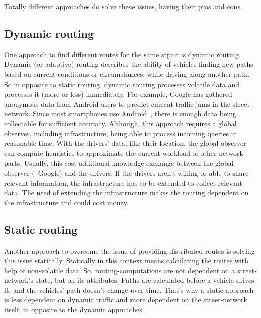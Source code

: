     Totally different approaches do solve these issues, having their pros and cons.

    \subsection{Dynamic routing}

        One approach to find different routes for the same \gls{stpair} is dynamic routing.
        Dynamic (or adaptive) routing describes the ability of vehicles finding new paths based on current conditions or circumstances, while driving along another path.
        So in opposite to static routing, dynamic routing processes volatile data and processes it (more or less) immediately.
        For example, Google has gathered~\cite{barth:google-traffic} anonymous data from Android-users to predict current traffic-jams in the street-network.
        Since most smartphones use Android~\cite{kantar:android-vs-ios}, there is enough data being collectable for sufficient accuracy.
        Although, this approach requires a global observer, including infrastructure, being able to process incoming queries in reasonable time.
        With the drivers' data, like their location, the global observer can compute heuristics to approximate the current workload of other network-parts.
        Usually, this cost additional knowledge-exchange between the global observer (\eg\ Google) and the drivers.
        If the drivers aren't willing or able to share relevant information, the infrastructure has to be extended to collect relevant data.
        The need of extending the infrastructure makes the routing dependent on the infrastructure and could cost money.

    \subsection{Static routing}

        Another approach to overcome the issue of providing distributed routes is solving this issue statically.
        Statically in this context means calculating the routes with help of non-volatile data.
        So, routing-computations are not dependent on a street-network's state, but on its attributes.
        Paths are calculated before a vehicle drives it, and the vehicles' path doesn't change over time.
        That's why a static approach is less dependent on dynamic traffic and more dependent on the street-network itself, in opposite to the dynamic approaches.

